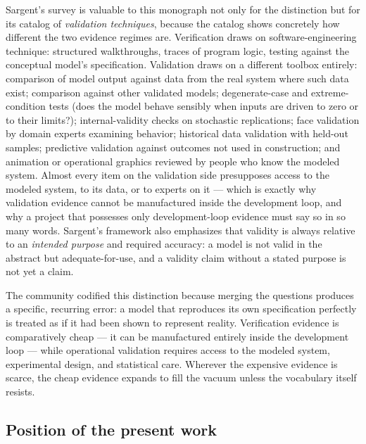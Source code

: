 Sargent's survey is valuable to this monograph not only for the
distinction but for its catalog of \emph{validation techniques}, because
the catalog shows concretely how different the two evidence regimes are.
Verification draws on software-engineering technique: structured
walkthroughs, traces of program logic, testing against the conceptual
model's specification. Validation draws on a different toolbox entirely:
comparison of model output against data from the real system where such
data exist; comparison against other validated models; degenerate-case
and extreme-condition tests (does the model behave sensibly when inputs
are driven to zero or to their limits?); internal-validity checks on
stochastic replications; face validation by domain experts examining
behavior; historical data validation with held-out samples; predictive
validation against outcomes not used in construction; and animation or
operational graphics reviewed by people who know the modeled system.
Almost every item on the validation side presupposes access to the
modeled system, to its data, or to experts on it --- which is exactly
why validation evidence cannot be manufactured inside the development
loop, and why a project that possesses only development-loop evidence
must say so in so many words. Sargent's framework also emphasizes that
validity is always relative to an \emph{intended purpose} and required
accuracy: a model is not valid in the abstract but adequate-for-use, and
a validity claim without a stated purpose is not yet a claim.

The community codified this distinction because merging the questions
produces a specific, recurring error: a model that reproduces its own
specification perfectly is treated as if it had been shown to represent
reality. Verification evidence is comparatively cheap --- it can be
manufactured entirely inside the development loop --- while operational
validation requires access to the modeled system, experimental design,
and statistical care. Wherever the expensive evidence is scarce, the
cheap evidence expands to fill the vacuum unless the vocabulary itself
resists.

\subsection{Position of the present work}\label{ch02:vandv:position}

